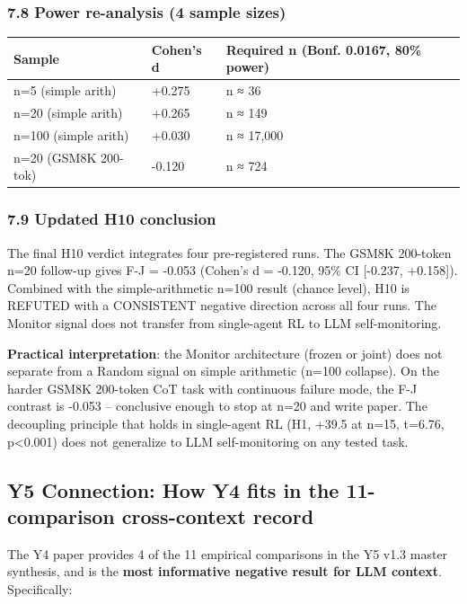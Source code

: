 \documentclass[
]{article}
\newcounter{none} %
\begin{document}
\subsubsection{7.8 Power re-analysis (4 sample
sizes)}\label{power-re-analysis-4-sample-sizes}

{\def\LTcaptype{none} %
\begin{longtable}[]{@{}lll@{}}
\toprule\noalign{}
Sample & Cohen's d & Required n (Bonf. 0.0167, 80\% power) \\
\midrule\noalign{}
\endhead
\bottomrule\noalign{}
\endlastfoot
n=5 (simple arith) & +0.275 & n ≈ 36 \\
n=20 (simple arith) & +0.265 & n ≈ 149 \\
n=100 (simple arith) & +0.030 & n ≈ 17,000 \\
n=20 (GSM8K 200-tok) & -0.120 & n ≈ 724 \\
\end{longtable}
}

\subsubsection{7.9 Updated H10 conclusion}\label{updated-h10-conclusion}

The final H10 verdict integrates four pre-registered runs. The GSM8K
200-token n=20 follow-up gives F-J = -0.053 (Cohen's d = -0.120, 95\% CI
{[}-0.237, +0.158{]}). Combined with the simple-arithmetic n=100 result
(chance level), H10 is REFUTED with a CONSISTENT negative direction
across all four runs. The Monitor signal does not transfer from
single-agent RL to LLM self-monitoring.

\textbf{Practical interpretation}: the Monitor architecture (frozen or
joint) does not separate from a Random signal on simple arithmetic
(n=100 collapse). On the harder GSM8K 200-token CoT task with continuous
failure mode, the F-J contrast is -0.053 -- conclusive enough to stop at
n=20 and write paper. The decoupling principle that holds in
single-agent RL (H1, +39.5 at n=15, t=6.76, p\textless0.001) does not
generalize to LLM self-monitoring on any tested task.

\subsection{Y5 Connection: How Y4 fits in the 11-comparison
cross-context
record}\label{y5-connection-how-y4-fits-in-the-11-comparison-cross-context-record}

The Y4 paper provides 4 of the 11 empirical comparisons in the Y5 v1.3
master synthesis, and is the \textbf{most informative negative result
for LLM context}. Specifically:
\end{document}
